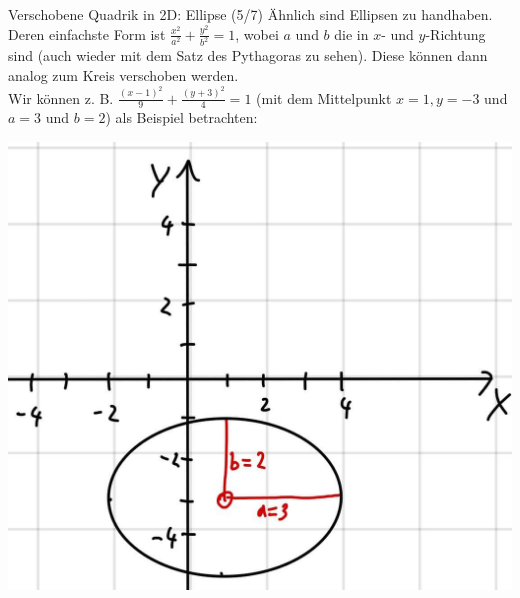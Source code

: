 \begin{Beispiel}
{Verschobene Quadrik in 2D: Ellipse (5/7)}
Ähnlich sind Ellipsen zu handhaben.\\
Deren einfachste Form ist $\frac{x^2}{a^2}+\frac{y^2}{b^2}=1$, wobei $a$ und $b$ die  in $x$- und $y$-Richtung sind (auch wieder mit dem Satz des Pythagoras zu sehen). Diese können dann analog zum Kreis verschoben werden.\\
Wir können z. B. $\boxed{\frac{(x-1)^2}{9}+\frac{(y+3)^2}{4}=1}$ (mit dem Mittelpunkt $x=1, y=-3$ und $a=3$ und $b=2$) als Beispiel betrachten:
\begin{center}
    \includegraphics[width=.23\textwidth]{Dateien/05/05Quadrik5.jpg}
\end{center}
\end{Beispiel}
